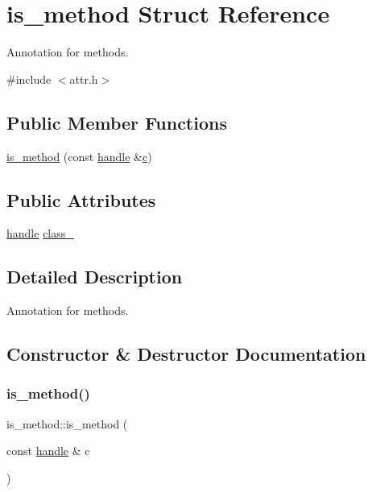\hypertarget{structis__method}{}\section{is\+\_\+method Struct Reference}
\label{structis__method}


Annotation for methods.  




{\ttfamily \#include $<$attr.\+h$>$}

\subsection*{Public Member Functions}
\begin{DoxyCompactItemize}
\item 
\mbox{\hyperlink{structis__method_a485eb88610e6850e945058bab969ea75}{is\+\_\+method}} (const \mbox{\hyperlink{classhandle}{handle}} \&\mbox{\hyperlink{_s_d_l__opengl__glext_8h_a1f2d7f8147412c43ba2303a56f97ee73}{c}})
\end{DoxyCompactItemize}
\subsection*{Public Attributes}
\begin{DoxyCompactItemize}
\item 
\mbox{\hyperlink{classhandle}{handle}} \mbox{\hyperlink{structis__method_afc73c1a3bd92b1dc49872a16bdeeba0c}{class\+\_\+}}
\end{DoxyCompactItemize}


\subsection{Detailed Description}
Annotation for methods. 

\subsection{Constructor \& Destructor Documentation}
\mbox{\label{structis__method_a485eb88610e6850e945058bab969ea75}} 
\subsubsection{\texorpdfstring{is\_method()}{is\_method()}}
{\footnotesize\ttfamily is\+\_\+method\+::is\+\_\+method (\begin{DoxyParamCaption}\item[{const \mbox{\hyperlink{classhandle}{handle}} \&}]{c }\end{DoxyParamCaption})\hspace{0.3cm}{\ttfamily [inline]}}



